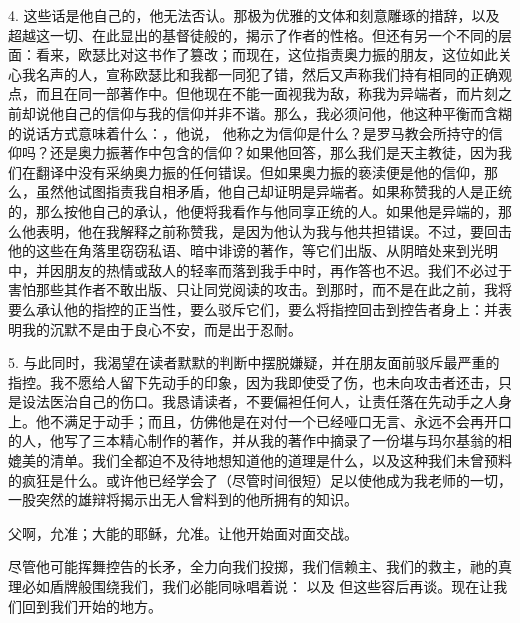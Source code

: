 4. 这些话是他自己的，他无法否认。那极为优雅的文体和刻意雕琢的措辞，以及超越这一切、在此显出的基督徒般的，揭示了作者的性格。但还有另一个不同的层面：看来，欧瑟比对这书作了篡改；而现在，这位指责奥力振的朋友，这位如此关心我名声的人，宣称欧瑟比和我都一同犯了错，然后又声称我们持有相同的正确观点，而且在同一部著作中。但他现在不能一面视我为敌，称我为异端者，而片刻之前却说他自己的信仰与我的信仰并非不谐。那么，我必须问他，他这种平衡而含糊的说话方式意味着什么：，他说， 他称之为信仰是什么？是罗马教会所持守的信仰吗？还是奥力振著作中包含的信仰？如果他回答，那么我们是天主教徒，因为我们在翻译中没有采纳奥力振的任何错误。但如果奥力振的亵渎便是他的信仰，那么，虽然他试图指责我自相矛盾，他自己却证明是异端者。如果称赞我的人是正统的，那么按他自己的承认，他便将我看作与他同享正统的人。如果他是异端的，那么他表明，他在我解释之前称赞我，是因为他认为我与他共担错误。不过，要回击他的这些在角落里窃窃私语、暗中诽谤的著作，等它们出版、从阴暗处来到光明中，并因朋友的热情或敌人的轻率而落到我手中时，再作答也不迟。我们不必过于害怕那些其作者不敢出版、只让同党阅读的攻击。到那时，而不是在此之前，我将要么承认他的指控的正当性，要么驳斥它们，要么将指控回击到控告者身上：并表明我的沉默不是由于良心不安，而是出于忍耐。\par

5. 与此同时，我渴望在读者默默的判断中摆脱嫌疑，并在朋友面前驳斥最严重的指控。我不愿给人留下先动手的印象，因为我即使受了伤，也未向攻击者还击，只是设法医治自己的伤口。我恳请读者，不要偏袒任何人，让责任落在先动手之人身上。他不满足于动手；而且，仿佛他是在对付一个已经哑口无言、永远不会再开口的人，他写了三本精心制作的著作，并从我的著作中摘录了一份堪与玛尔基翁的相媲美的清单。我们全都迫不及待地想知道他的道理是什么，以及这种我们未曾预料的疯狂是什么。或许他已经学会了（尽管时间很短）足以使他成为我老师的一切，一股突然的雄辩将揭示出无人曾料到的他所拥有的知识。\par

父啊，允准；大能的耶稣，允准。\newline{}让他开始面对面交战。\par

尽管他可能挥舞控告的长矛，全力向我们投掷，我们信赖主、我们的救主，祂的真理必如盾牌般围绕我们，我们必能同咏唱着说： 以及  但这些容后再谈。现在让我们回到我们开始的地方。\par


